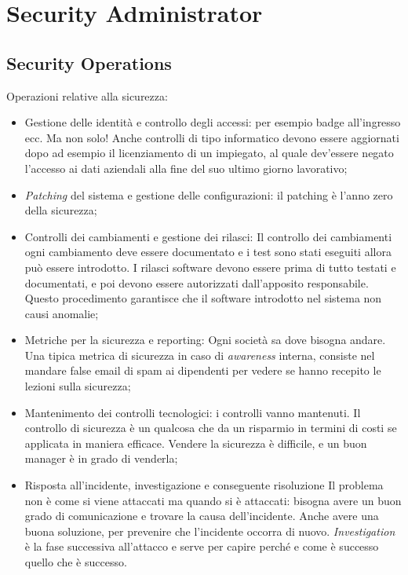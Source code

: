 
\chapter{Security Administrator}
\label{SA}

\section{Security Operations}
\label{SA:SO}

Operazioni relative alla sicurezza:
\begin{itemize}
\item Gestione delle identità e controllo degli accessi: per esempio badge 
all'ingresso ecc. Ma non solo! Anche controlli di tipo informatico devono
essere aggiornati dopo ad esempio il licenziamento di un impiegato, al quale
dev'essere negato l'accesso ai dati aziendali alla fine del suo ultimo giorno
lavorativo;
\item \textit{Patching} del sistema e gestione delle configurazioni: il
patching è l'anno zero della sicurezza;
\item Controlli dei cambiamenti e gestione dei rilasci: Il controllo dei 
cambiamenti ogni cambiamento deve essere documentato e i test sono stati 
eseguiti allora può essere introdotto.
I rilasci software devono essere prima di tutto testati e documentati, e poi
devono essere autorizzati dall'apposito responsabile. Questo procedimento
garantisce che il software introdotto nel sistema non causi anomalie;
\item Metriche per la sicurezza e reporting: Ogni società sa dove bisogna 
andare. Una tipica metrica di sicurezza in caso di \emph{awareness} interna,
consiste nel mandare false email di spam ai dipendenti per vedere se
hanno recepito le lezioni sulla sicurezza;
\item Mantenimento dei controlli tecnologici: i controlli vanno mantenuti. 
Il controllo di sicurezza è un qualcosa che da un risparmio in termini di costi 
se applicata in maniera efficace. Vendere la sicurezza è difficile, e un buon 
manager è in grado di venderla;

\item Risposta all'incidente, investigazione e conseguente risoluzione
Il problema non è come si viene attaccati ma quando si è attaccati: bisogna 
avere un buon grado di comunicazione e trovare la causa dell'incidente. Anche 
avere una buona soluzione, per prevenire che l'incidente occorra di nuovo.
\textit{Investigation} è la fase successiva all'attacco e serve per capire 
perché e come è successo quello che è successo.

\end{itemize}


